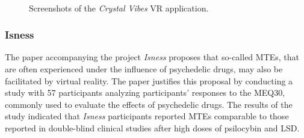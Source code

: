 \begin{figure}%
    \centering
    \\
    \caption{Screenshots of the \textit{Crystal Vibes} \ac{VR} application.}%
    \label{fig:outram2017crystal}%
\end{figure}

\subsubsection{Isness}
The paper \autocite{glowacki2020isness} accompanying the project \textit{Isness} proposes that so-called \acp{MTE}, that are often experienced under the influence of psychedelic drugs, may also be facilitated by virtual reality. The paper justifies this proposal by conducting a study with 57 participants analyzing participants' responses to the \ac{MEQ30}, commonly used to evaluate the effects of psychedelic drugs. The results of the study indicated that \textit{Isness} participants reported \acp{MTE} comparable to those reported in double-blind clinical studies after high doses of psilocybin and \ac{LSD}.

